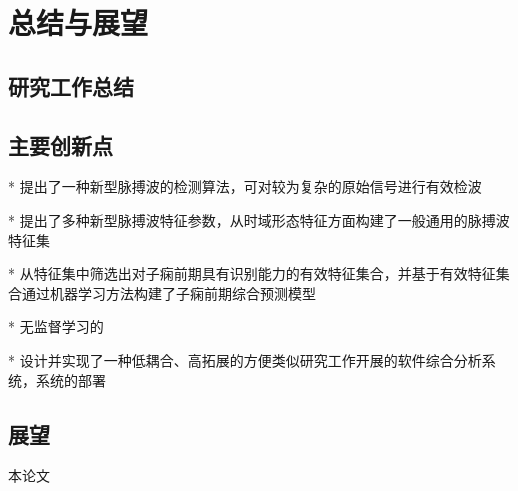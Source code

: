 \chapter{总结与展望}
\section{研究工作总结}
\section{主要创新点}
* 提出了一种新型脉搏波的检测算法，可对较为复杂的原始信号进行有效检波

* 提出了多种新型脉搏波特征参数，从时域形态特征方面构建了一般通用的脉搏波特征集

* 从特征集中筛选出对子痫前期具有识别能力的有效特征集合，并基于有效特征集合通过机器学习方法构建了子痫前期综合预测模型

* 无监督学习的

* 设计并实现了一种低耦合、高拓展的方便类似研究工作开展的软件综合分析系统，系统的部署

\section{展望}
本论文